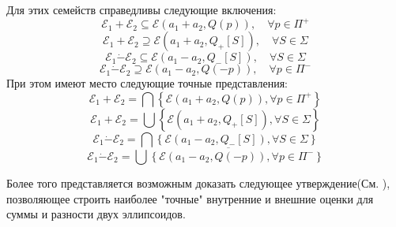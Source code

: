 \begin{theorem}
\begin{itemize}
\begin{equation*}
        \end{equation*}
    \end{itemize}
    Для этих семейств справедливы следующие включения:
    \begin{equation}
        \mathcal{E}_1 + \mathcal{E}_2 \subseteq \mathcal{E}(a_1 + a_2, Q(p)), \quad \forall p \in \Pi^+
    \end{equation}
    \begin{equation}
        \mathcal{E}_1 + \mathcal{E}_2 \supseteq \mathcal{E}(a_1 + a_2, Q_+[S]), \quad \forall S \in \Sigma
    \end{equation}
    \begin{equation}
        \mathcal{E}_1 \dot{-} \mathcal{E}_2 \subseteq \mathcal{E}(a_1 - a_2, Q_-[S]), \quad \forall S \in \Sigma
    \end{equation}
    \begin{equation}
        \mathcal{E}_1 \dot{-} \mathcal{E}_2 \supseteq \mathcal{E}(a_1 - a_2, Q(-p)), \quad \forall p \in \Pi^-
    \end{equation}
    При этом имеют место следующие точные представления:
    \begin{equation}
        \mathcal{E}_1 + \mathcal{E}_2 = \bigcap \left\{ \mathcal{E}(a_1 + a_2, Q(p)), \forall p \in \Pi^+ \right\}
    \end{equation}
    \begin{equation}
        \mathcal{E}_1 + \mathcal{E}_2 = \bigcup \left\{ \mathcal{E}(a_1 + a_2, Q_+[S]), \forall S \in \Sigma \right\}
    \end{equation}
    \begin{equation}
        \mathcal{E}_1 \dot{-} \mathcal{E}_2 = \bigcap \left\{ \mathcal{E}(a_1 - a_2, Q_-[S]), \forall S \in \Sigma \right\}
    \end{equation}
    \begin{equation}
        \mathcal{E}_1 \dot{-} \mathcal{E}_2 = \overline{ \bigcup \left\{ \mathcal{E}(a_1 - a_2, Q(-p)), \forall p \in \Pi^- \right\} }
    \end{equation}
\end{theorem}

Более того представляется возможным доказать следующее утверждение(См. \cite{ellips_calculus}), позволяющее
 строить наиболее "точные" внутренние и внешние оценки для суммы и разности двух эллипсоидов. 

